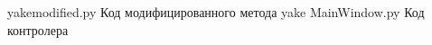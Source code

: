 \begin{appendices}
	\chapter{}
	{yakemodified.py}
	{Код модифицированного метода yake}
	{MainWindow.py}
	{Код контролера}
\end{appendices}